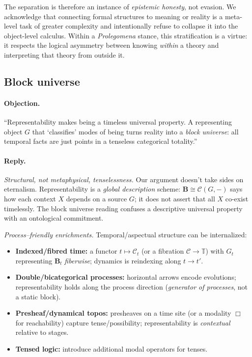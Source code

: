 \documentclass[11pt]{article}
\theoremstyle{upright}
\begin{document}
The separation is therefore an instance of \emph{epistemic honesty}, not evasion. We acknowledge that connecting formal structures to meaning or reality is a meta-level task of greater complexity and intentionally refuse to collapse it into the object-level calculus. Within a \emph{Prolegomena} stance, this stratification is a virtue: it respects the logical asymmetry between knowing \emph{within} a theory and interpreting that theory from outside it.

\subsection{Block universe}
\paragraph{Objection.}
“Representability makes being a timeless universal property. A representing object $G$ that ‘classifies’ modes of being turns reality into a \emph{block universe}: all temporal facts are just points in a tenseless categorical totality.”

\paragraph{Reply.}
\emph{Structural, not metaphysical, tenselessness.} Our argument doesn't take sides on eternalism. Representability is a \emph{global description} scheme: 
\(
\mathbf B \cong \mathcal C(G,-)
\)
says how each context $X$ depends on a source $G$; it does not assert that all $X$ co-exist timelessly. The block universe reading confuses a descriptive universal property with an ontological commitment.

\smallskip
\emph{Process–friendly enrichments.} Temporal/aspectual structure can be internalized:
\begin{itemize}[leftmargin=1.8em]
\item \textbf{Indexed/fibred time:} a functor $t\mapsto \mathcal C_t$ (or a fibration $\mathcal C\!\to\!\mathbb T$) with $G_t$ representing $\mathbf B_t$ \emph{fiberwise}; dynamics is reindexing along $t\!\to\!t'$.
\item \textbf{Double/bicategorical processes:} horizontal arrows encode evolutions; representability holds along the process direction (\emph{generator of processes}, not a static block).
\item \textbf{Presheaf/dynamical topos:} presheaves on a time site (or a modality $\Box$ for reachability) capture tense/possibility; representability is \emph{contextual} relative to stages.
\item \textbf{Tensed logic:} introduce additional modal operators for tenses. \citep{Prior1967}
\end{itemize}
\end{document}
